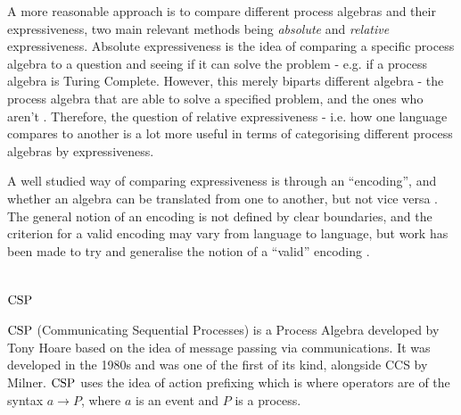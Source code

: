 \documentclass[../hons_project.tex]{subfiles}
\begin{document}
A more reasonable approach is to compare different process algebras and their expressiveness, two main relevant methods being \textit{absolute} and \textit{relative} expressiveness.\citep{parrowExpressivenessProcessAlgebras2008} Absolute expressiveness is the idea of comparing a specific process algebra to a question and seeing if it can solve the problem - e.g. if a process algebra is Turing Complete. However, this merely biparts different algebra - the process algebra that are able to solve a specified problem, and the ones who aren't \citep{gorlaUnifiedApproachEncodability2010}. Therefore, the question of relative expressiveness - i.e. how one language compares to another is a lot more useful in terms of categorising different process algebras by expressiveness.

A well studied way of comparing expressiveness is through an ``encoding'', and whether an algebra can be translated from one to another, but not vice versa \citep{petersComparingProcessCalculi2019}. The general notion of an encoding is not defined by clear boundaries, and the criterion for a valid encoding may vary from language to language, but work has been made to try and generalise the notion of a ``valid'' encoding \citep{gorlaUnifiedApproachEncodability2010, DBLP:conf/fossacs/Glabbeek18}.

\section{\texorpdfstring{$\mathrm{CSP}$}{CSP}}
$\mathrm{CSP}$ (Communicating Sequential Processes) \citep{brookesTheoryCommunicatingSequential1984} is a Process Algebra developed by Tony Hoare based on the idea of message passing via communications. It was developed in the 1980s and was one of the first of its kind, alongside CCS by Milner. $\mathrm{CSP}$ uses the idea of action prefixing which is where operators are of the syntax $a \to P$, where $a$ is an event and $P$ is a process. 

\end{document}
